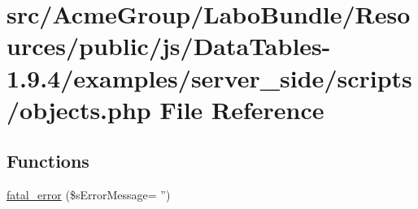 \hypertarget{objects_8php}{\section{src/\+Acme\+Group/\+Labo\+Bundle/\+Resources/public/js/\+Data\+Tables-\/1.9.4/examples/server\+\_\+side/scripts/objects.php File Reference}
\label{objects_8php}
}
\subsection*{Functions}
\begin{DoxyCompactItemize}
\item 
\hyperlink{objects_8php_a1bb235f2e57f0389e14b11592d32119a}{fatal\+\_\+error} (\$s\+Error\+Message= '')
\end{DoxyCompactItemize}
